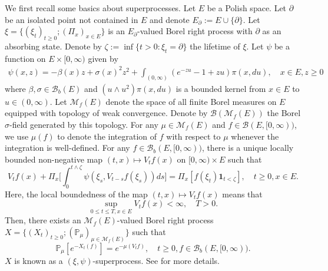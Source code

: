\documentclass[12pt,a4paper]{amsart}
\numberwithin{equation}{section}
\theoremstyle{plain}
\theoremstyle{definition}
\theoremstyle{remark}
\begin{document}
	We first recall some basics about superprocesses. %
	Let $E$ be a Polish space. %
	Let $\partial$ be an isolated point not contained in $E$ and denote $E_\partial := E \cup \{\partial\}$. %
	Let  $\xi= \{(\xi_t)_{t\ge0}; (\Pi_x)_{x\in E}\}$ is an $E_\partial$-valued Borel right process with $\partial$ as an absorbing state. Denote by $\zeta:=\inf\{t>0: \xi_t=\partial\}$ the lifetime of $\xi$. %
	Let $\psi$ be a function on $E \times [0,\infty)$ given by
\begin{align}
	\psi(x,z)
	= -\beta(x) z + \sigma(x)^2 z^2 + \int_{(0,\infty)} (e^{-zu} -1 + zu) \pi(x,du),
	\quad x\in E, z\geq 0
\end{align}
	where $\beta, \sigma \in \mathcal B_b(E)$ and $(u \wedge u^2) \pi(x,du)$ is a bounded kernel from $x\in E$ to $u\in(0,\infty)$.
	Let $\mathcal M_f(E)$ denote the space of all finite Borel measures on $E$ equipped with topology of weak convergence.
	Denote by $\mathcal B(\mathcal M_f(E))$ the Borel $\sigma$-field generated by this topology. For any $\mu \in \mathcal M_f(E)$ and $f\in \mathcal B(E,[0,\infty))$, we use $\mu(f)$ to denote the integration of $f$ with respect to $\mu$ whenever the integration is well-defined. %
	For any $f \in \mathcal B_b(E,[0,\infty))$, there is a unique locally bounded non-negative map $(t,x)\mapsto V_tf(x)$ on $[0,\infty)\times E$ such that %
\begin{equation} \label{eq: 1}
	V_tf(x) + \Pi_x\Big[\int_0^{t\wedge \zeta} \psi(\xi_s, V_{t-s} f(\xi_s)) ds\Big] = \Pi_x[f(\xi_t) \mathbf 1_{t< \zeta}], \quad t\geq 0, x\in E. %
\end{equation}
	Here, the local boundedness of the map $(t,x) \mapsto V_tf(x)$ means that \[ \sup_{0\leq t\leq T, x\in E} V_tf(x) < \infty, \quad T>0.\] %
	Then, there exists an $\mathcal M_f(E)$-valued Borel right process $X =\{(X_t)_{t\geq 0}; (\mathbb P_\mu)_{\mu \in \mathcal M_f(E)}\}$ such that
\begin{equation}
	\mathbb P_\mu[e^{- X_t(f)}]
	= e^{- \mu(V_tf)},
	\quad t\geq 0, f \in \mathcal B_b(E,[0,\infty)).
\end{equation}
	$X$ is known as a $(\xi, \psi)$-superprocess.  See \cite{Li2011MeasureValued} for more details.
\end{document}

